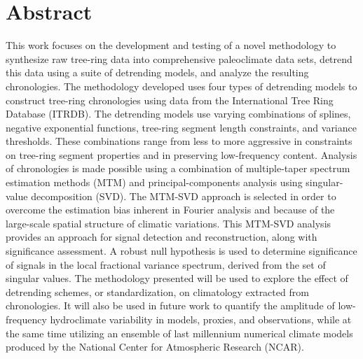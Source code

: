 \documentclass[phd,tocprelim]{cornell}
\begin{document}
\section{Abstract}
  This work focuses on the development and testing of a novel methodology 
  to synthesize raw tree-ring data into comprehensive paleoclimate 
  data sets, detrend this data using a suite of detrending models, 
  and analyze the resulting chronologies. The methodology developed uses four types 
  of detrending models to construct tree-ring chronologies using 
  data from the International Tree Ring Database (ITRDB). The detrending 
  models use varying combinations of splines, negative exponential 
  functions, tree-ring segment length constraints, and variance 
  thresholds. These combinations range from less to more aggressive 
  in constraints on tree-ring segment properties and in preserving 
  low-frequency content. Analysis of chronologies is made possible using a 
  combination of multiple-taper spectrum estimation 
  methods (MTM) and principal-components analysis using singular-value 
  decomposition (SVD). The MTM-SVD approach is selected in order to 
  overcome the estimation bias inherent in Fourier analysis and because 
  of the large-scale spatial structure of climatic variations. This 
  MTM-SVD analysis provides an approach for signal detection and 
  reconstruction, along with significance assessment. A robust null 
  hypothesis is used to determine significance of signals in the local 
  fractional variance spectrum, derived from the set of singular values. 
  The methodology presented will be used to explore the effect of 
  detrending schemes, or standardization, on climatology extracted 
  from chronologies. It will also be used in future work to quantify 
  the amplitude of low-frequency hydroclimate variability in models, 
  proxies, and observations, while at the same time utilizing an ensemble 
  of last millennium numerical climate models produced by the National 
  Center for Atmospheric Research (NCAR).  
\end{document}
